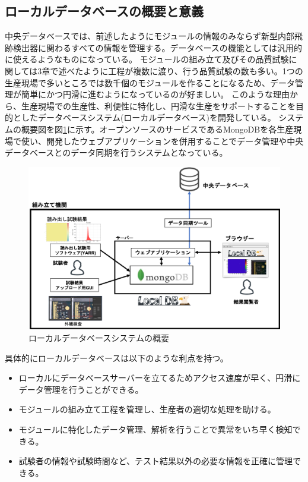 \subsection{ローカルデータベースの概要と意義}
中央データベースでは、前述したようにモジュールの情報のみならず新型内部飛跡検出器に関わるすべての情報を管理する。データベースの機能としては汎用的に使えるようなものになっている。
モジュールの組み立て及びその品質試験に関しては3章で述べたように工程が複数に渡り、行う品質試験の数も多い。1つの生産現場で多いところでは数千個のモジュールを作ることになるため、データ管理が簡単にかつ円滑に進むようになっているのが好ましい。
このような理由から、生産現場での生産性、利便性に特化し、円滑な生産をサポートすることを目的としたデータベースシステム(ローカルデータベース)を開発している。
システムの概要図を図\ref{localdb_overview}に示す。オープンソースのサービスであるMongoDBを各生産現場で使い、開発したウェブアプリケーションを併用することでデータ管理や中央データベースとのデータ同期を行うシステムとなっている。

\begin{figure}[bpt]\centering
\includegraphics[width=15cm]{localdb_overview}
\caption[ローカルデータベースシステムの概要]{ローカルデータベースシステムの概要}
\label{localdb_overview}
\end{figure}

具体的にローカルデータベースは以下のような利点を持つ。

\begin{itemize}
  \item ローカルにデータベースサーバーを立てるためアクセス速度が早く、円滑にデータ管理を行うことができる。
  \item モジュールの組み立て工程を管理し、生産者の適切な処理を助ける。
  \item モジュールに特化したデータ管理、解析を行うことで異常をいち早く検知できる。
  \item 試験者の情報や試験時間など、テスト結果以外の必要な情報を正確に管理できる。
\end{itemize}

